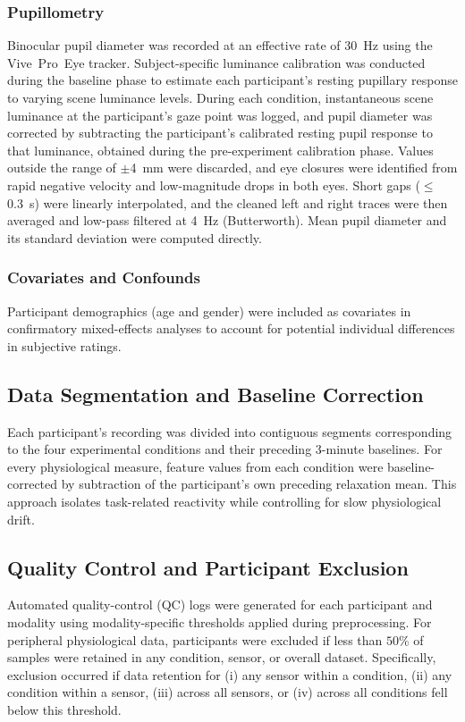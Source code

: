 \documentclass[lettersize,journal]{IEEEtran}
\begin{document}
\subsubsection{Pupillometry}
Binocular pupil diameter was recorded at an effective rate of 30~Hz using the Vive~Pro~Eye tracker. 
Subject-specific luminance calibration was conducted during the baseline phase to estimate each participant’s resting pupillary response to varying scene luminance levels. During each condition, instantaneous scene luminance at the participant’s gaze point was logged, and pupil diameter was corrected by subtracting the participant’s calibrated resting pupil response to that luminance, obtained during the pre-experiment calibration phase.
Values outside the range of $\pm$4~mm were discarded, and eye closures were identified from rapid negative velocity and low-magnitude drops in both eyes. 
Short gaps ($\leq$0.3~s) were linearly interpolated, and the cleaned left and right traces were then averaged and low-pass filtered at 4~Hz (Butterworth).
Mean pupil diameter and its standard deviation were computed directly.


\subsubsection{Covariates and Confounds}
Participant demographics (age and gender) were included as covariates in confirmatory mixed-effects analyses to account for potential individual differences in subjective ratings. 


\subsection{Data Segmentation and Baseline Correction}
Each participant’s recording was divided into contiguous segments corresponding to the four experimental conditions and their preceding 3-minute baselines. For every physiological measure, feature values from each condition were baseline-corrected by subtraction of the participant’s own preceding relaxation mean. This approach isolates task-related reactivity while controlling for slow physiological drift.

\subsection{Quality Control and Participant Exclusion}
\label{sec:qc}

Automated quality-control (QC) logs were generated for each participant and modality using modality-specific thresholds applied during preprocessing. For peripheral physiological data, participants were excluded if less than $50\%$ of samples were retained in any condition, sensor, or overall dataset. Specifically, exclusion occurred if data retention for (i) any sensor within a condition, (ii) any condition within a sensor, (iii) across all sensors, or (iv) across all conditions fell below this threshold.
\end{document}

